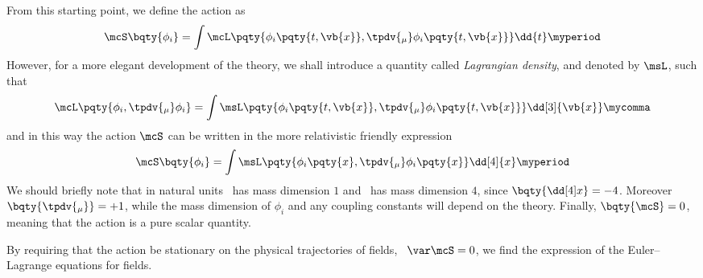         From this starting point, we define the action as
        \begin{equation}
            \mcS\bqty{\phi_i} = \int \mcL\pqty{\phi_i\pqty{t, \vb{x}}, \tpdv{_\mu}\phi_i\pqty{t, \vb{x}}} \dd{t}
            \myperiod
        \end{equation}
        However, for a more elegant development of the theory, we shall introduce a quantity called \emph{Lagrangian density}, and denoted by $\msL$, such that
        \begin{equation}
            \mcL\pqty{\phi_i, \tpdv{_\mu}\phi_i} = \int \msL\pqty{\phi_i\pqty{t, \vb{x}}, \tpdv{_\mu}\phi_i\pqty{t, \vb{x}}} \dd[3]{\vb{x}}
            \mycomma
        \end{equation}
        and in this way the action $\mcS$ can be written in the more relativistic friendly expression
        \begin{equation}
            \mcS\bqty{\phi_i} = \int \msL\pqty{\phi_i\pqty{x}, \tpdv{_\mu}\phi_i\pqty{x}} \dd[4]{x}
            \myperiod
        \end{equation}
        We should briefly note that in natural units \mcL\ has mass dimension $1$ and \msL\ has mass dimension $4$, since $\bqty{\dd[4]x} = -4$.
        Moreover $\bqty{\tpdv{_\mu}} = +1$, while the mass dimension of $\phi_i$ and any coupling constants will depend on the theory.
        Finally, $\bqty{\mcS} = 0$, meaning that the action is a pure scalar quantity.

        By requiring that the action be stationary on the physical trajectories of fields, \latinie\ $\var\mcS = 0$, we find the expression of the Euler--Lagrange equations for fields.

